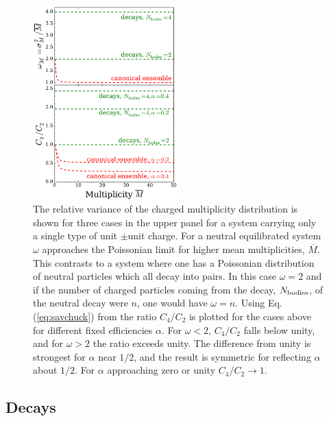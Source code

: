\begin{figure}
\centerline{\includegraphics[width=0.5\textwidth]{figs/savchuck}}
\caption{\label{fig:savchuck}
The relative variance of the charged multiplicity distribution is shown for three cases in the upper panel for a system carrying only a single type of unit $\pm$unit charge. For a neutral equilibrated system $\omega$ approaches the Poissonian limit for higher mean multiplicities, $\overline{M}$. This contrasts to a system where one has a Poissonian distribution of neutral particles which all decay into pairs. In this case $\omega=2$ and if the number of charged particles coming from the decay, $N_{\rm bodies}$, of the neutral decay were $n$, one would have $\omega=n$. Using Eq. (\ref{eq:savchuck}) from \cite{savchuck} the ratio $C_4/C_2$ is plotted for the cases above for different fixed efficiencies $\alpha$. For $\omega<2$, $C_4/C_2$ falls below unity, and for $\omega>2$ the ratio exceeds unity. The difference from unity is strongest for $\alpha$ near $1/2$, and the result is symmetric for reflecting $\alpha$ about $1/2$. For $\alpha$ approaching zero or unity $C_4/C_2\rightarrow 1$.}
\end{figure}

\subsection{Decays}

